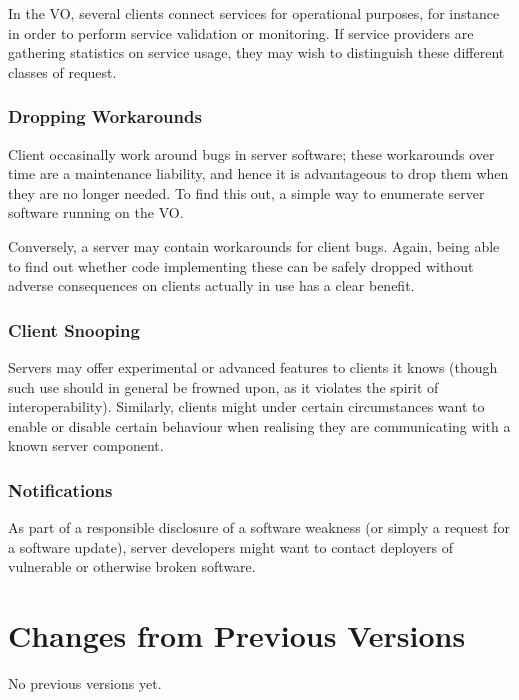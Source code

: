 \documentclass[11pt,a4paper]{ivoa}
\begin{document}
In the VO, several clients connect services for operational purposes,
for instance in order to perform service validation or monitoring. If
service providers are gathering statistics on service usage, they may
wish to distinguish these different classes of request.

\subsubsection{Dropping Workarounds}

Client occasinally work around bugs in server software; these
workarounds over time are a maintenance liability, and hence it is
advantageous to drop them when they are no longer needed.  To find this
out, a simple way to enumerate server software running on the VO.

Conversely, a server may contain workarounds for client bugs.  Again,
being able to find out whether code implementing these can be safely
dropped without adverse consequences on clients actually in use has a
clear benefit.

\subsubsection{Client Snooping}

Servers may offer experimental or advanced features to clients it knows
(though such use should in general be frowned upon, as it violates the
spirit of interoperability).  Similarly, clients might under certain
circumstances want to enable or disable certain behaviour when realising
they are communicating with a known server component.

\subsubsection{Notifications}

As part of a responsible disclosure of a software weakness (or simply a
request for a software update), server developers might want to contact
deployers of vulnerable or otherwise broken software.


\appendix
\section{Changes from Previous Versions}

No previous versions yet.  



\end{document}
